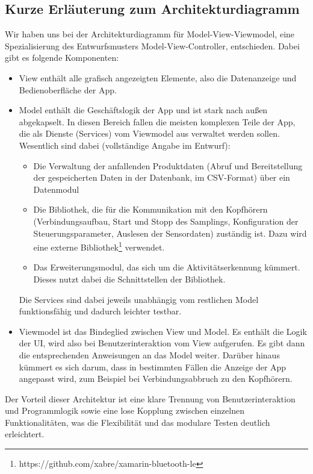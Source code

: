 \documentclass[a4paper,12pt]{article}
\begin{document}
  \subsection{Kurze Erläuterung zum Architekturdiagramm}
  Wir haben uns bei der Architekturdiagramm für \textsf{Model-View-Viewmodel}, eine Spezialisierung  des Entwurfsmusters Model-View-Controller, entschieden.
  Dabei gibt es folgende Komponenten:
  \begin{itemize}
    \item \textsf{\glqq View\grqq{}} enthält alle grafisch angezeigten Elemente, also die Datenanzeige und Bedienoberfläche der App.
    \item {\textsf{\glqq Model\grqq{}} enthält die Geschäftslogik der App und ist stark nach außen abgekapselt. In diesen Bereich fallen die meisten komplexen Teile der App, die als Dienste (Services) vom Viewmodel aus verwaltet werden sollen. Wesentlich sind dabei (vollständige Angabe im Entwurf): \begin{itemize}
      \item Die Verwaltung der anfallenden Produktdaten (Abruf und Bereitstellung der gespeicherten Daten in der Datenbank, im CSV-Format) über ein Datenmodul
      \item Die Bibliothek, die für die Kommunikation mit den Kopfhörern (Verbindungsaufbau, Start und Stopp des Samplings, Konfiguration der \Gls{Steuerungsparameter}, Auslesen der Sensordaten) zuständig ist. Dazu wird eine externe Bibliothek\footnote{https://github.com/xabre/xamarin-bluetooth-le} verwendet.
      \item Das Erweiterungsmodul, das sich um die Aktivitätserkennung kümmert. Dieses nutzt dabei die Schnittstellen der Bibliothek.
    \end{itemize}
    Die Services sind dabei jeweils unabhängig vom restlichen Model funktionsfähig und dadurch leichter testbar.}
    \item \textsf{\glqq Viewmodel\grqq{}} ist das Bindeglied zwischen View und Model. Es enthält die Logik der UI, wird also bei Benutzerinteraktion vom View aufgerufen. Es gibt dann die entsprechenden Anweisungen an das Model weiter. Darüber hinaus kümmert es sich darum, dass in bestimmten Fällen die Anzeige der App angepasst wird, zum Beispiel bei Verbindungsabbruch zu den Kopfhörern. 
    
  \end{itemize}
  Der Vorteil dieser Architektur ist eine klare Trennung von Benutzerinteraktion und Programmlogik sowie eine lose Kopplung zwischen einzelnen Funktionalitäten, was die Flexibilität und das modulare Testen deutlich erleichtert.
\end{document}
